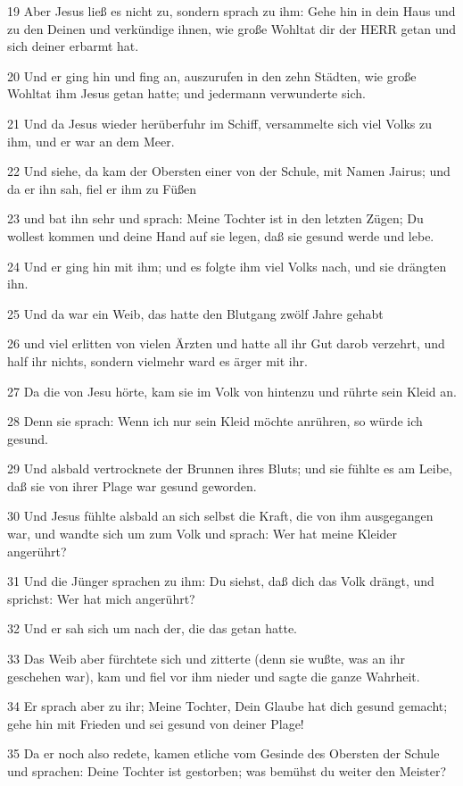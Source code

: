 \par 19 Aber Jesus ließ es nicht zu, sondern sprach zu ihm: Gehe hin in dein Haus und zu den Deinen und verkündige ihnen, wie große Wohltat dir der HERR getan und sich deiner erbarmt hat.
\par 20 Und er ging hin und fing an, auszurufen in den zehn Städten, wie große Wohltat ihm Jesus getan hatte; und jedermann verwunderte sich.
\par 21 Und da Jesus wieder herüberfuhr im Schiff, versammelte sich viel Volks zu ihm, und er war an dem Meer.
\par 22 Und siehe, da kam der Obersten einer von der Schule, mit Namen Jairus; und da er ihn sah, fiel er ihm zu Füßen
\par 23 und bat ihn sehr und sprach: Meine Tochter ist in den letzten Zügen; Du wollest kommen und deine Hand auf sie legen, daß sie gesund werde und lebe.
\par 24 Und er ging hin mit ihm; und es folgte ihm viel Volks nach, und sie drängten ihn.
\par 25 Und da war ein Weib, das hatte den Blutgang zwölf Jahre gehabt
\par 26 und viel erlitten von vielen Ärzten und hatte all ihr Gut darob verzehrt, und half ihr nichts, sondern vielmehr ward es ärger mit ihr.
\par 27 Da die von Jesu hörte, kam sie im Volk von hintenzu und rührte sein Kleid an.
\par 28 Denn sie sprach: Wenn ich nur sein Kleid möchte anrühren, so würde ich gesund.
\par 29 Und alsbald vertrocknete der Brunnen ihres Bluts; und sie fühlte es am Leibe, daß sie von ihrer Plage war gesund geworden.
\par 30 Und Jesus fühlte alsbald an sich selbst die Kraft, die von ihm ausgegangen war, und wandte sich um zum Volk und sprach: Wer hat meine Kleider angerührt?
\par 31 Und die Jünger sprachen zu ihm: Du siehst, daß dich das Volk drängt, und sprichst: Wer hat mich angerührt?
\par 32 Und er sah sich um nach der, die das getan hatte.
\par 33 Das Weib aber fürchtete sich und zitterte (denn sie wußte, was an ihr geschehen war), kam und fiel vor ihm nieder und sagte die ganze Wahrheit.
\par 34 Er sprach aber zu ihr; Meine Tochter, Dein Glaube hat dich gesund gemacht; gehe hin mit Frieden und sei gesund von deiner Plage!
\par 35 Da er noch also redete, kamen etliche vom Gesinde des Obersten der Schule und sprachen: Deine Tochter ist gestorben; was bemühst du weiter den Meister?

